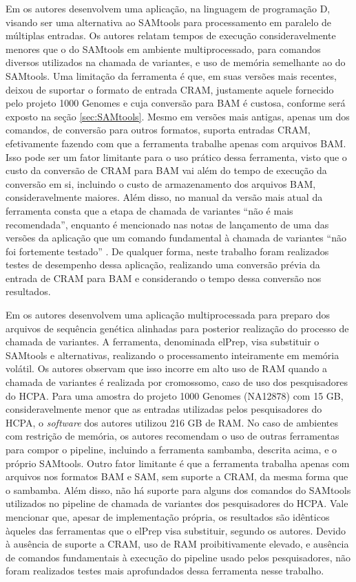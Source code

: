\documentclass[cic,tc]{iiufrgs}
\begin{document}
Em \cite{tarasov2015sambamba} os autores desenvolvem uma aplicação, na
linguagem de programação D, visando ser uma alternativa ao SAMtools para
processamento em paralelo de múltiplas entradas. Os autores relatam tempos de
execução consideravelmente menores que o do SAMtools em ambiente
multiprocessado, para comandos diversos utilizados na chamada de variantes, e
uso de memória semelhante ao do SAMtools. Uma limitação da ferramenta é que, em
suas versões mais recentes, deixou de suportar o formato de entrada CRAM,
justamente aquele fornecido pelo projeto 1000 Genomes e cuja conversão para BAM é
custosa, conforme será exposto na seção \ref{sec:SAMtools}. Mesmo em versões
mais antigas, apenas um dos comandos, de conversão para outros formatos,
suporta entradas CRAM, efetivamente fazendo com que a ferramenta trabalhe
apenas com arquivos BAM. Isso pode ser um fator limitante para o uso prático
dessa ferramenta, visto que o custo da conversão de CRAM para BAM vai além do
tempo de execução da conversão em si, incluindo o custo de armazenamento dos
arquivos BAM, consideravelmente maiores. Além disso, no manual da versão mais
atual da ferramenta consta que a etapa de chamada de variantes ``não é mais
recomendada'', enquanto é mencionado nas notas de lançamento de uma das versões
da aplicação que um comando fundamental à chamada de variantes ``não foi
fortemente testado'' \cite{manual2015sambamba}. De qualquer forma, neste
trabalho foram realizados testes de desempenho dessa aplicação, realizando uma
conversão prévia da entrada de CRAM para BAM e considerando o tempo dessa
conversão nos resultados.

Em \cite{herzeel2015elprep} os autores desenvolvem uma aplicação
multiprocessada para preparo dos arquivos de sequência genética alinhadas para
posterior realização do processo de chamada de variantes. A ferramenta,
denominada elPrep, visa substituir o SAMtools e alternativas, realizando o
processamento inteiramente em memória volátil. Os autores observam que isso
incorre em alto uso de RAM quando a chamada de variantes é realizada por
cromossomo, caso de uso dos pesquisadores do HCPA. Para uma amostra do projeto
1000 Genomes (NA12878) com 15 GB, consideravelmente menor que as entradas
utilizadas pelos pesquisadores do HCPA, o \textit{software} dos autores utilizou 216 GB
de RAM. No caso de ambientes com restrição de memória, os autores recomendam o
uso de outras ferramentas para compor o pipeline, incluindo a ferramenta
sambamba, descrita acima, e o próprio SAMtools. Outro fator limitante é que a
ferramenta trabalha apenas com arquivos nos formatos BAM e SAM, sem suporte a
CRAM, da mesma forma que o sambamba. Além disso, não há suporte para alguns dos
comandos do SAMtools utilizados no pipeline de chamada de variantes dos
pesquisadores do HCPA. Vale mencionar que, apesar de implementação própria, os
resultados são idênticos àqueles das ferramentas que o elPrep visa substituir,
segundo os autores. Devido à ausência de suporte a CRAM, uso de RAM
proibitivamente elevado, e ausência de comandos fundamentais à execução do
pipeline usado pelos pesquisadores, não foram realizados testes mais
aprofundados dessa ferramenta nesse trabalho.
\end{document}
